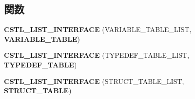 \subsection*{関数}
\begin{DoxyCompactItemize}
\item 
{\bfseries CSTL\_\-LIST\_\-INTERFACE} (VARIABLE\_\-TABLE\_\-LIST, {\bf VARIABLE\_\-TABLE})\label{_synbol_8h_a03f40d95d6184c3aa260f0494ca2b6fd}

\item 
{\bfseries CSTL\_\-LIST\_\-INTERFACE} (TYPEDEF\_\-TABLE\_\-LIST, {\bf TYPEDEF\_\-TABLE})\label{_synbol_8h_a32d9863c09d6bd2a54d67763539d911c}

\item 
{\bfseries CSTL\_\-LIST\_\-INTERFACE} (STRUCT\_\-TABLE\_\-LIST, {\bf STRUCT\_\-TABLE})\label{_synbol_8h_a9c69bd2010dc86e2e4315d27a18cd379}


\end{DoxyCompactItemize}
